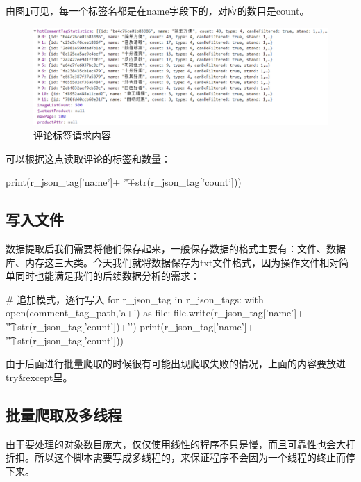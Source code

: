 由图\ref{img:yhb7}可见，每一个标签名都是在name字段下的，对应的数目是count。

\begin{figure}[htbp]
\centering
\includegraphics[width=13.5cm]{img/yhb/cmt_tags_eg_jd.png}
\caption{评论标签请求内容}
\label{img:yhb7}   %
\end{figure}

可以根据这点读取评论的标签和数量：

\begin{python}
print(r_json_tag['name']+
                      '\t'+str(r_json_tag['count']))
\end{python}

\subsection{写入文件}

数据提取后我们需要将他们保存起来，一般保存数据的格式主要有：文件、数据库、内存这三大类。今天我们就将数据保存为txt文件格式，因为操作文件相对简单同时也能满足我们的后续数据分析的需求：

\begin{python}
# 追加模式，逐行写入
        for r_json_tag in r_json_tags:
            with open(comment_tag_path,'a+') as file:
                file.write(r_json_tag['name']+
                           '\t'+str(r_json_tag['count'])+'\n')
                print(r_json_tag['name']+
                      '\t'+str(r_json_tag['count']))
\end{python}

由于后面进行批量爬取的时候很有可能出现爬取失败的情况，上面的内容要放进try\&except里。

\subsection{批量爬取及多线程}

由于要处理的对象数目庞大，仅仅使用线性的程序不只是慢，而且可靠性也会大打折扣。所以这个脚本需要写成多线程的，来保证程序不会因为一个线程的终止而停下来。

